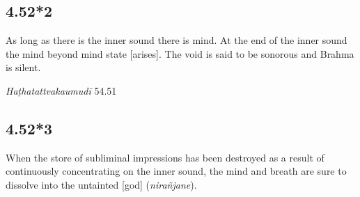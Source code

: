 \begin{ekdosis}
\subsection*{4.52*2}
\begin{translation}[hp04_052_2]
As long as there is the inner sound there is mind. At the end of the inner sound the mind beyond mind state [arises]. The void is said to be sonorous and Brahma is silent.
\end{translation}


\begin{testimonia}[hp04_052_2]
\emph{Haṭhatattvakaumudī} 54.51
\begin{versinnote}
\end{versinnote}
\end{testimonia}


\subsection*{4.52*3}
\begin{translation}[hp04_052_3]
When the store of subliminal impressions has been destroyed as a result of continuously concentrating on the inner sound, the mind and breath are sure to dissolve into the untainted [god] (\emph{nirañjane}).
\end{translation}%
%


\begin{testimonia}[hp04_052_3]


\end{testimonia}
\end{ekdosis}
